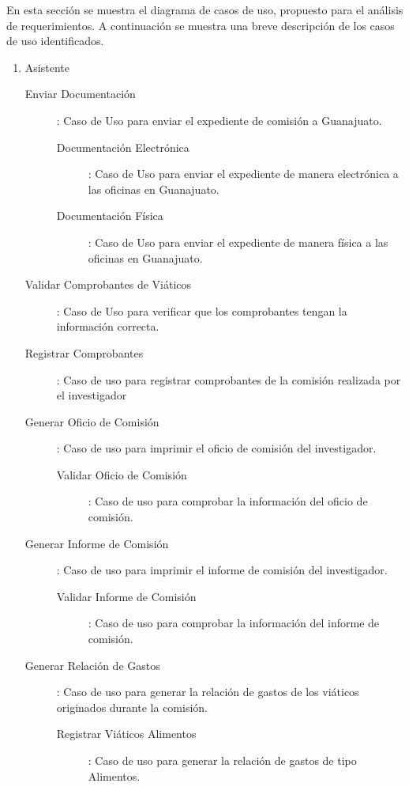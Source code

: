 \documentclass{report}
\begin{document}
    En esta sección se muestra el diagrama de casos de uso, propuesto para el análisis de requerimientos. A continuación se muestra una breve descripción  de los casos de uso identificados.\\
    \begin{enumerate}
        \item Asistente    
        \begin{description}
            \item[Enviar Documentación]: Caso de Uso para enviar el expediente de comisión a Guanajuato.
            \begin{description}
                \item[Documentación Electrónica]: Caso de Uso para enviar el expediente de manera electrónica a las oficinas en Guanajuato.
                \item[Documentación Física]: Caso de Uso para enviar el expediente de manera física a las oficinas en Guanajuato.
            \end{description}
            \item[Validar Comprobantes de Viáticos]: Caso de Uso para verificar que los comprobantes tengan la información correcta.
            \item[Registrar Comprobantes]: Caso de uso para registrar comprobantes de la comisión realizada por el investigador
            \item[Generar Oficio de Comisión]: Caso de uso para imprimir el oficio de comisión del investigador.
            \begin{description}
                \item[Validar Oficio de Comisión]: Caso de uso para comprobar la información del oficio de comisión.
            \end{description}
            \item[Generar Informe de Comisión]: Caso de uso para imprimir el informe de comisión del investigador. 
            \begin{description}
                \item[Validar Informe de Comisión]: Caso de uso para comprobar la información del informe de comisión.
            \end{description}
            \item[Generar Relación de Gastos]: Caso de uso para generar la relación de gastos de los viáticos originados  durante la comisión.
            \begin{description}
                \item[Registrar Viáticos Alimentos]: Caso de uso para generar la relación de gastos de tipo Alimentos.

\end{description}
\end{description}
\end{enumerate}
\end{document}

